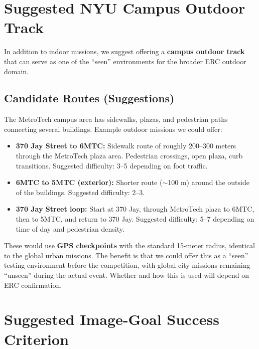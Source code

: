 \documentclass[11pt,a4paper]{article}
\begin{document}
\section{Suggested NYU Campus Outdoor Track}

In addition to indoor missions, we suggest offering a \textbf{campus outdoor track} that can serve as one of the ``seen'' environments for the broader ERC outdoor domain.

\subsection{Candidate Routes (Suggestions)}

The MetroTech campus area has sidewalks, plazas, and pedestrian paths connecting several buildings. Example outdoor missions we could offer:

\begin{itemize}
    \item \textbf{370 Jay Street to 6MTC:} Sidewalk route of roughly 200--300 meters through the MetroTech plaza area. Pedestrian crossings, open plaza, curb transitions. Suggested difficulty: 3--5 depending on foot traffic.
    \item \textbf{6MTC to 5MTC (exterior):} Shorter route ($\sim$100 m) around the outside of the buildings. Suggested difficulty: 2--3.
    \item \textbf{370 Jay Street loop:} Start at 370 Jay, through MetroTech plaza to 6MTC, then to 5MTC, and return to 370 Jay. Suggested difficulty: 5--7 depending on time of day and pedestrian density.
\end{itemize}

These would use \textbf{GPS checkpoints} with the standard 15-meter radius, identical to the global urban missions. The benefit is that we could offer this as a ``seen'' testing environment before the competition, with global city missions remaining ``unseen'' during the actual event. Whether and how this is used will depend on ERC confirmation.


\section{Suggested Image-Goal Success Criterion}
\label{sec:goal-criterion}
\end{document}
